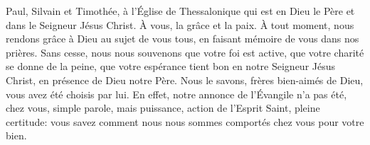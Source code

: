 Paul, Silvain et Timothée,
	à l’Église de Thessalonique qui est en Dieu le Père et dans le Seigneur Jésus Christ.
	À vous, la grâce et la paix.
À tout moment, nous rendons grâce à Dieu au sujet de vous tous,
	en faisant mémoire de vous dans nos prières.
Sans cesse, nous nous souvenons que votre foi est active,
	que votre charité se donne de la peine,
	que votre espérance tient bon en notre Seigneur Jésus Christ,
	en présence de Dieu notre Père.
Nous le savons, frères bien-aimés de Dieu, vous avez été choisis par lui.
En effet, notre annonce de l’Évangile n’a pas été, chez vous, simple parole,
	mais puissance, action de l’Esprit Saint, pleine certitude:
	vous savez comment nous nous sommes comportés chez vous pour votre bien.
